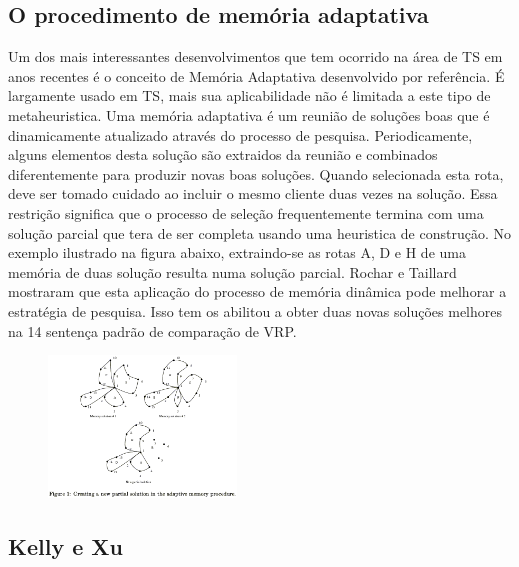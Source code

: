 \subsection{O procedimento de memória adaptativa}

 Um dos mais interessantes desenvolvimentos que tem ocorrido na área de TS em anos recentes é o
conceito de Memória Adaptativa desenvolvido por {\color{red} referência}. É largamente usado em TS,
mais sua aplicabilidade não é limitada a este tipo de metaheuristica. Uma memória adaptativa é um
reunião de soluções boas que é dinamicamente atualizado através do processo de pesquisa.
Periodicamente, alguns elementos desta solução são extraidos da reunião e combinados diferentemente
para produzir novas boas soluções. Quando selecionada esta rota, deve ser tomado cuidado ao incluir
o mesmo cliente duas vezes na solução. Essa restrição significa que o processo de seleção
frequentemente termina com uma solução parcial que tera de ser completa usando uma heuristica de
construção. No exemplo ilustrado na figura abaixo, extraindo-se as rotas A, D e H de uma memória de
duas solução resulta numa solução parcial. Rochar e Taillard mostraram que esta aplicação do
processo de memória dinâmica pode melhorar a estratégia de pesquisa. Isso tem os abilitou a obter
duas novas soluções melhores na 14 sentença padrão de comparação de VRP.

\begin{figure}[!ht]
\centering
\includegraphics[width=5cm]{fig/RochatTaillard95.png}
\end{figure}


\subsection{Kelly e Xu}

